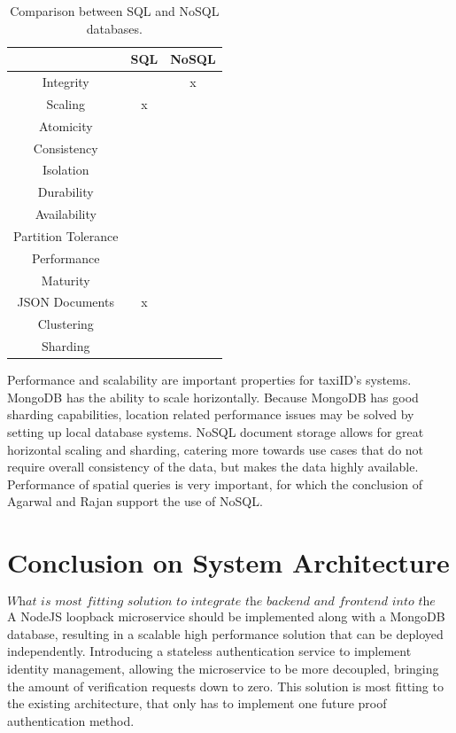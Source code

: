 \begin{table}[htbp!]
	\centering
	\begin{tabular}{c|c|c}
		\toprule
		& SQL & NoSQL \\
		\midrule
		Integrity & \checkmark\checkmark & x \\
		Scaling & x & \checkmark\checkmark \\
		Atomicity & \checkmark & \checkmark \\
		Consistency & \checkmark\checkmark & \checkmark \\
		Isolation & \checkmark & \checkmark \\
		Durability & \checkmark & \checkmark \\
		Availability & \checkmark & \checkmark\checkmark \\
		Partition Tolerance & \checkmark & \checkmark \\
		Performance & \checkmark & \checkmark\checkmark \\
		Maturity & \checkmark\checkmark & \checkmark \\
		JSON Documents & x & \checkmark \\
		Clustering & \checkmark & \checkmark \\
		Sharding & \checkmark & \checkmark\checkmark \\
		\bottomrule
	\end{tabular}
	\caption[Databases Comparison]{Comparison between SQL and NoSQL databases.}
	\label{tab:databases-comparison}
\end{table}

Performance and scalability are important properties for taxiID's systems. MongoDB has the ability to scale horizontally. Because MongoDB has good sharding capabilities, location related performance issues may be solved by setting up local database systems. NoSQL document storage allows for great horizontal scaling and sharding, catering more towards use cases that do not require overall consistency of the data, but makes the data highly available. Performance of spatial queries is very important, for which the conclusion of Agarwal and Rajan support the use of NoSQL.

%
\section{Conclusion on System Architecture}
\[\textit{What is most fitting solution to integrate the backend and frontend into the existing architecture?}\] \hfill
A NodeJS loopback microservice should be implemented along with a MongoDB database, resulting in a scalable high performance solution that can be deployed independently. Introducing a stateless authentication service to implement identity management, allowing the microservice to be more decoupled, bringing the amount of verification requests down to zero. This solution is most fitting to the existing architecture, that only has to implement one future proof authentication method.
